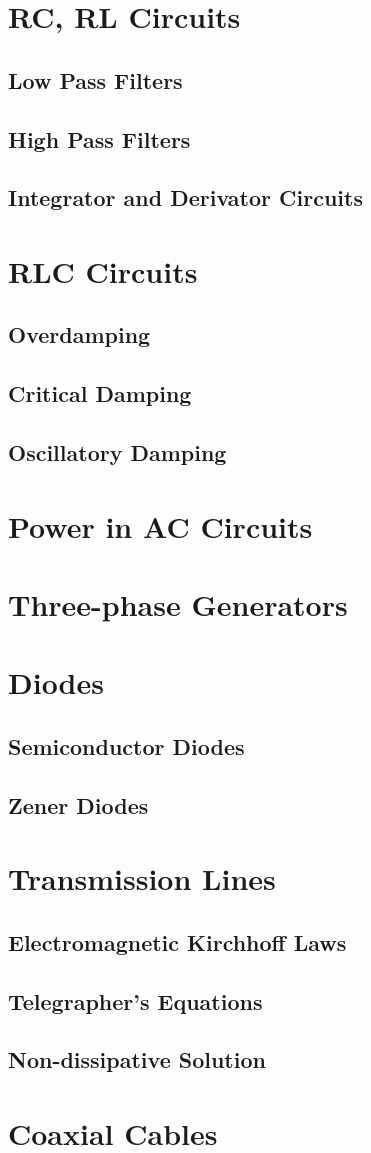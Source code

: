 \documentclass[../electromagnetism.tex]{subfiles}
\begin{document}
\section{RC, RL Circuits}
\subsection{Low Pass Filters}
\subsection{High Pass Filters}
\subsection{Integrator and Derivator Circuits}
\section{RLC Circuits}
\subsection{Overdamping}
\subsection{Critical Damping}
\subsection{Oscillatory Damping}
\section{Power in AC Circuits}
\section{Three-phase Generators}
\section{Diodes}
\subsection{Semiconductor Diodes}
\subsection{Zener Diodes}
\section{Transmission Lines}
\subsection{Electromagnetic Kirchhoff Laws}
\subsection{Telegrapher's Equations}
\subsection{Non-dissipative Solution}
\section{Coaxial Cables}
\end{document}
